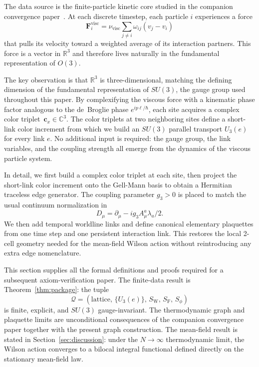 \documentclass[11pt]{article}
\theoremstyle{remark}
\newcommand{\R}{\mathbb R}
\newcommand{\C}{\mathbb C}
\begin{document}
The data source is the finite-particle kinetic core studied in the companion
convergence paper~\cite{convergence}.
At each discrete timestep, each particle $i$ experiences a force
\[
  \mathbf F^{\mathrm{visc}}_i
  = \nu_{\mathrm{visc}}\sum_{j\neq i}\omega_{ij}(v_j - v_i)
\]
that pulls its velocity toward a weighted average of its interaction partners.
This force is a vector in $\R^3$ and therefore lives naturally in the fundamental
representation of $O(3)$.

The key observation is that $\R^3$ is three-dimensional, matching the defining
dimension of the fundamental representation of $SU(3)$, the gauge group used
throughout this paper.
By complexifying the viscous force with a kinematic phase factor analogous to the
de~Broglie phase $e^{ip\ell/\hbar}$, each site acquires a complex
color triplet~$\mathbf c_x\in\C^3$.
The color triplets at two neighboring sites define a short-link color increment
from which we build an \(SU(3)\) parallel transport \(U_3(e)\) for every link \(e\).
No additional input is required: the gauge group, the link variables, and
the coupling strength all emerge from the dynamics of the viscous particle system.

In detail, we first build a complex color triplet at each site, then project the
short-link color increment onto the Gell-Mann basis to obtain a Hermitian
traceless edge generator. The coupling parameter \(g_3>0\) is placed to match
the usual continuum normalization in
\[
D_\mu=\partial_\mu-ig_3 A_\mu^a\lambda_a/2.
\]
We then add temporal worldline links and define canonical elementary plaquettes
from one time step and one persistent interaction link. This restores the local
2-cell geometry needed for the mean-field Wilson action without
reintroducing any extra edge nomenclature.

This section supplies all the formal definitions and proofs required for a
subsequent axiom-verification paper.
The finite-data result is Theorem~\ref{thm:package}: the tuple
\[
\mathcal Q = (\text{lattice},\,\{U_3(e)\},\,S_\mathrm W,\,S_\mathrm F,\,S_\phi)
\]
is finite, explicit, and $SU(3)$ gauge-invariant.
The thermodynamic graph and plaquette limits are unconditional consequences of
the companion convergence paper together with the present graph construction.
The mean-field result is stated in Section~\ref{sec:discussion}: under the
$N\to\infty$ thermodynamic limit, the Wilson action converges to a bilocal
integral functional defined directly on the stationary mean-field law.
\end{document}
